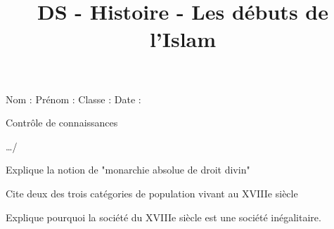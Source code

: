 \documentclass[12pt,a4paper]{exam}
\title{DS - Histoire - Les débuts de l'Islam}
\begin{document}
\begin{minipage}{19cm}
  Nom : \hspace{3cm}  Prénom : \hspace{3cm}   Classe : \hspace{3cm}  Date : 
\end{minipage}
\hfill



\vspace{1cm}

\begin{center}

{\Large Contrôle de connaissances}

\vspace{0.5cm}
  \end{center}

 \hfill {\large …/\numpoints\ } %
 
 \begin{questions}
 \question[2] Explique la notion de "monarchie absolue de droit divin" \\
 
 
 \fillwithdottedlines{3cm}
 
 \begin{solution}
 \vspace{3cm}
 \end{solution}
 
 \question[1] Cite deux des trois catégories de population vivant au XVIIIe siècle
  \fillwithdottedlines{2cm}
   
   \begin{solution}
   \vspace{2cm}
   \end{solution}
  
   \question[2] Explique pourquoi la société du XVIIIe siècle est une société inégalitaire.
   \fillwithdottedlines{3cm}
      
      \begin{solution}
      \vspace{3cm}
      \end{solution}
 \end{questions}


 
 
\end{document}
